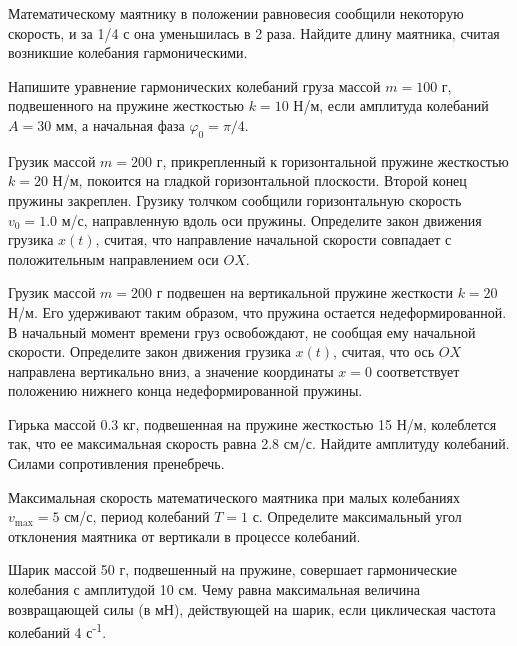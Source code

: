\begin{ex}
Математическому маятнику в положении равновесия сообщили некоторую скорость, и за 1/4 с она уменьшилась в 2 раза. Найдите длину маятника, считая возникшие колебания гармоническими.
\end{ex}	

\begin{ex}
Напишите уравнение гармонических колебаний груза массой $m = 100$ г, подвешенного на пружине жесткостью $k = 10$ Н/м, если амплитуда колебаний $A = 30 $ мм, а начальная фаза $\varphi_0 = \pi/4$.
\end{ex}	

\begin{ex}
Грузик массой $m = 200$ г, прикрепленный к горизонтальной пружине жесткостью $k = 20 $ Н/м, покоится на гладкой горизонтальной плоскости. Второй конец пружины закреплен. Грузику толчком сообщили горизонтальную скорость $v_0 = 1.0$ м/с, направленную вдоль оси пружины. Определите закон движения грузика $x(t)$, считая, что направление начальной скорости совпадает с положительным направлением оси $OX$.
\end{ex}	

\begin{ex}
Грузик массой $m = 200$ г подвешен на вертикальной пружине жесткости $k = 20$ Н/м. Его удерживают таким образом, что пружина остается недеформированной. В начальный момент времени груз освобождают, не сообщая ему начальной скорости. Определите закон движения грузика $x(t)$, считая, что ось $OX$ направлена вертикально вниз, а значение координаты $x = 0$ соответствует положению нижнего конца недеформированной пружины.
\end{ex}	

\begin{ex}
Гирька массой 0.3 кг, подвешенная на пружине жесткостью 15 Н/м, колеблется так, что ее максимальная скорость равна 2.8 см/с. Найдите амплитуду колебаний. Силами сопротивления пренебречь.
\end{ex}	

\begin{ex}
Максимальная скорость математического маятника при малых колебаниях $v_{\max} = 5 $ см/с, период колебаний $T = 1$ с. Определите максимальный угол отклонения маятника от вертикали в процессе колебаний.
\end{ex}	

\begin{ex}
Шарик массой 50 г, подвешенный на пружине, совершает гармонические колебания с амплитудой 10 см. Чему равна максимальная величина возвращающей силы (в мН), действующей на шарик, если циклическая частота колебаний 4 с\textsuperscript{-1}.
\end{ex}	


